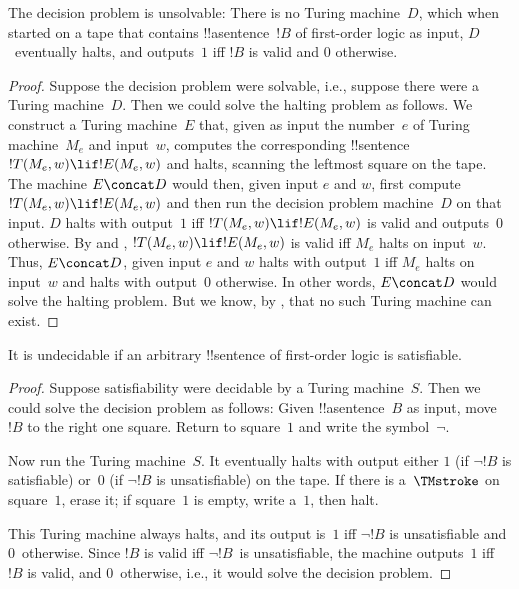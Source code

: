 \documentclass[../../../include/open-logic-section]{subfiles}
\begin{document}

\begin{thm}
The decision problem is unsolvable: There is no Turing machine~$D$,
which when started on a tape that contains !!a{sentence}~$!B$ of
first-order logic as input, $D$~eventually halts, and outputs~$1$ iff
$!B$ is valid and $0$ otherwise.
\end{thm}

\begin{proof}
Suppose the decision problem were solvable, i.e., suppose there were a
Turing machine~$D$. Then we could solve the halting problem as
follows. We construct a Turing machine~$E$ that, given as input the
number~$e$ of Turing machine~$M_e$ and input~$w$, computes the
corresponding !!{sentence}~$!T(M_e, w) \lif !E(M_e, w)$ and halts,
scanning the leftmost square on the tape.  The machine $E \concat D$
would then, given input $e$ and $w$, first compute~$!T(M_e, w) \lif
!E(M_e, w)$ and then run the decision problem machine~$D$ on that
input.  $D$ halts with output~$1$ iff $!T(M_e, w) \lif !E(M_e, w)$ is
valid and outputs~$0$ otherwise. By  and
, $!T(M_e, w) \lif !E(M_e, w)$ is valid
iff $M_e$ halts on input~$w$. Thus, $E\concat D$, given input $e$ and
$w$ halts with output~$1$ iff $M_e$ halts on input~$w$ and halts with
output~$0$ otherwise. In other words, $E \concat D$ would solve the
halting problem.  But we know, by ,
that no such Turing machine can exist.
\end{proof}

\begin{cor}%
It is undecidable if an arbitrary !!{sentence} of first-order logic is satisfiable.
\end{cor}

\begin{proof}
  Suppose satisfiability were decidable by a Turing machine~$S$. Then
  we could solve the decision problem as follows: Given
  !!a{sentence}~$B$ as input, move $!B$ to the right one square.
  Return to square~$1$ and write the symbol~$\lnot$.

  Now run the Turing machine~$S$. It eventually halts with output
  either $1$ (if $\lnot !B$ is satisfiable) or~$0$ (if $\lnot !B$ is
  unsatisfiable) on the tape. If there is a~$\TMstroke$ on square~$1$,
  erase it; if square~$1$ is empty, write a~$1$, then halt.

  This Turing machine always halts, and its output is~$1$ iff $\lnot
  !B$ is unsatisfiable and $0$~otherwise. Since $!B$ is valid iff
  $\lnot !B$~is unsatisfiable, the machine outputs~$1$ iff $!B$ is
  valid, and $0$~otherwise, i.e., it would solve the decision problem.
\end{proof}
\end{document}
